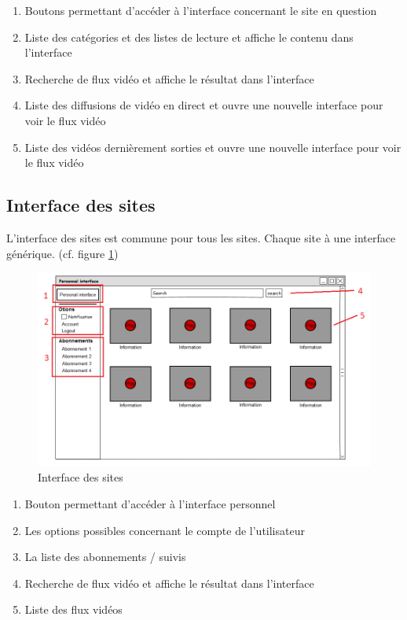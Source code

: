 \documentclass[11pt]{report} %
\begin{document}
			\begin{enumerate}
				\item Boutons permettant d'accéder à l'interface concernant le site en question
				\item Liste des catégories et des listes de lecture et affiche le contenu dans l'interface
				\item Recherche de flux vidéo et affiche le résultat dans l'interface
				\item Liste des diffusions de vidéo en direct et ouvre une nouvelle interface pour voir le flux vidéo
				\item Liste des vidéos dernièrement sorties et ouvre une nouvelle interface pour voir le flux vidéo
			\end{enumerate}
		
		\newpage		
		
		\subsection{Interface des sites}
		L'interface des sites est commune pour tous les sites. Chaque site à une interface générique. (cf. figure \ref{interfacesites})
		\begin{figure}[h]
			\center
			\includegraphics[width=1\textwidth]{../img/serviceInterfacenum.png}
			\caption{Interface des sites}
			\label{interfacesites}
		\end{figure}
		
		\begin{enumerate}
			\item Bouton permettant d'accéder à l'interface personnel
			\item Les options possibles concernant le compte de l'utilisateur
			\item La liste des abonnements / suivis 
			\item Recherche de flux vidéo et affiche le résultat dans l'interface
			\item Liste des flux vidéos
		\end{enumerate}
\end{document}
